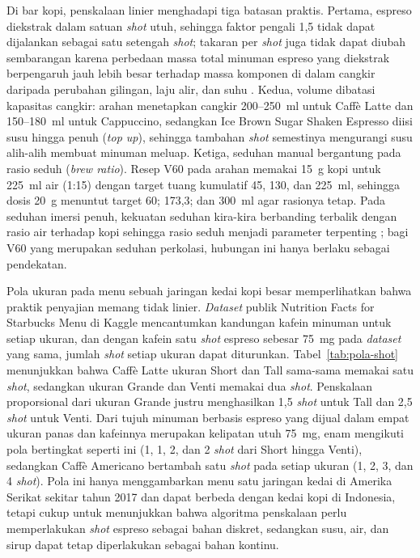 Di bar kopi, penskalaan linier menghadapi tiga batasan praktis. Pertama, espreso diekstrak dalam satuan \textit{shot} utuh, sehingga faktor pengali 1,5 tidak dapat dijalankan sebagai satu setengah \textit{shot}; takaran per \textit{shot} juga tidak dapat diubah sembarangan karena perbedaan massa total minuman espreso yang diekstrak berpengaruh jauh lebih besar terhadap massa komponen di dalam cangkir daripada perubahan gilingan, laju alir, dan suhu \citep*{schmieder2023influence}. Kedua, volume dibatasi kapasitas cangkir: arahan menetapkan cangkir 200--250~ml untuk Caffè Latte dan 150--180~ml untuk Cappuccino, sedangkan Ice Brown Sugar Shaken Espresso diisi susu hingga penuh (\textit{top up}), sehingga tambahan \textit{shot} semestinya mengurangi susu alih-alih membuat minuman meluap. Ketiga, seduhan manual bergantung pada rasio seduh (\textit{brew ratio}). Resep V60 pada arahan memakai 15~g kopi untuk 225~ml air (1:15) dengan target tuang kumulatif 45, 130, dan 225~ml, sehingga dosis 20~g menuntut target 60; 173,3; dan 300~ml agar rasionya tetap. Pada seduhan imersi penuh, kekuatan seduhan kira-kira berbanding terbalik dengan rasio air terhadap kopi sehingga rasio seduh menjadi parameter terpenting \citep*{liang2021equilibrium}; bagi V60 yang merupakan seduhan perkolasi, hubungan ini hanya berlaku sebagai pendekatan.

Pola ukuran pada menu sebuah jaringan kedai kopi besar memperlihatkan bahwa praktik penyajian memang tidak linier. \textit{Dataset} publik Nutrition Facts for Starbucks Menu di Kaggle \citep*{tatman2017nutrition} mencantumkan kandungan kafein minuman untuk setiap ukuran, dan dengan kafein satu \textit{shot} espreso sebesar 75~mg pada \textit{dataset} yang sama, jumlah \textit{shot} setiap ukuran dapat diturunkan. Tabel~\ref{tab:pola-shot} menunjukkan bahwa Caffè Latte ukuran Short dan Tall sama-sama memakai satu \textit{shot}, sedangkan ukuran Grande dan Venti memakai dua \textit{shot}. Penskalaan proporsional dari ukuran Grande justru menghasilkan 1,5 \textit{shot} untuk Tall dan 2,5 \textit{shot} untuk Venti. Dari tujuh minuman berbasis espreso yang dijual dalam empat ukuran panas dan kafeinnya merupakan kelipatan utuh 75~mg, enam mengikuti pola bertingkat seperti ini (1, 1, 2, dan 2 \textit{shot} dari Short hingga Venti), sedangkan Caffè Americano bertambah satu \textit{shot} pada setiap ukuran (1, 2, 3, dan 4 \textit{shot}). Pola ini hanya menggambarkan menu satu jaringan kedai di Amerika Serikat sekitar tahun 2017 dan dapat berbeda dengan kedai kopi di Indonesia, tetapi cukup untuk menunjukkan bahwa algoritma penskalaan perlu memperlakukan \textit{shot} espreso sebagai bahan diskret, sedangkan susu, air, dan sirup dapat tetap diperlakukan sebagai bahan kontinu.

